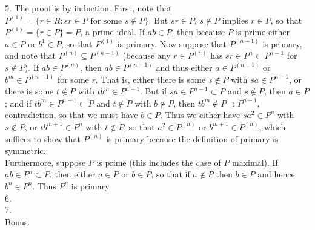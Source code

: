 \documentclass[11pt]{article}
\begin{document}
\num{5.} The proof is by induction. First, note that $P^{(1)}=\{r\in R: sr\in P\text{ for some }s\notin P\}$. But $sr\in P$, $s\notin P$ implies $r\in P$, so that $P^{(1)}=\{r\in P\}=P$, a prime ideal. If $ab\in P$, then because $P$ is prime either $a\in P$ or $b^1\in P$, so that $P^{(1)}$ is primary. Now suppose that $P^{(n-1)}$ is primary, and note that $P^{(n)}\subseteq P^{(n-1)}$ (because any $r\in P^{(n)}$ has $sr\in P^n\subset P^{n-1}$ for $s\notin P$). If $ab\in P^{(n)}$, then $ab\in P^{(n-1)}$ and thus either $a\in P^{(n-1)}$ or $b^m\in P^{(n-1)}$ for some $r$. That is, either there is some $s\notin P$ with $sa\in P^{n-1}$, or there is some $t\notin P$ with $tb^m\in P^{n-1}$. But if $sa\in P^{n-1}\subset P$ and $s\notin P$, then $a\in P$; and if $tb^m\in P^{n-1}\subset P$ and $t\notin P$ with $b\notin P$, then $tb^m\notin P\supset P^{n-1}$, contradiction, so that we must have $b\in P$. Thus we either have $sa^2\in P^n$ with $s\notin P$, or $tb^{m+1}\in P^n$ with $t\notin P$, so that $a^2\in P^{(n)}$ or $b^{m+1}\in P^{(n)}$, which suffices to show that $P^{(n)}$ is primary because the definition of primary is symmetric.       \\

Furthermore, suppose $P$ is prime (this includes the case of $P$ maximal). If $ab\in P^n\subset P$, then either $a\in P$ or $b\in P$, so that if $a\notin P$ then $b\in P$ and hence $b^n\in P^n$. Thus $P^n$ is primary.\\

\num{6.}        \\

\num{7.}        \\

\num{Bonus.}         
\end{document}
